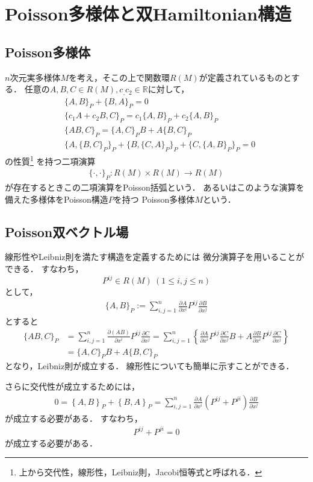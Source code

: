 \documentclass[dvipdfmx,12pt,a4paper,uplatex]{jsarticle}
\theoremstyle{plain}
\theoremstyle{definition}
\begin{document}
\section{Poisson多様体と双Hamiltonian構造}
\subsection{Poisson多様体}
$n次元$実多様体$M$を考え，そこの上で関数環$R(M)$が定義されているものとする．
任意の$A,B,C\in R(M),c_,c_2\in \mathbb{R}$に対して，
\begin{align}
&\{A,B \}_{P} + \{B,A\}_{P} = 0 \\
&\{c_1 A+c_2  B,C\}_{P} = c_1\{A,B\}_{P} + c_2\{A,B\}_{P} \\
&\{AB,C \}_{P} = \{A,C\}_{P}B + A\{B,C\}_{P} \\
&\{A,\{B,C\}_{P}\}_{P} + \{B,\{C,A\}_{P}\}_{P} + \{C,\{A,B\}_{P}\}_{P} = 0
\end{align}
の性質\footnote{上から交代性，線形性，Leibniz則，Jacobi恒等式と呼ばれる．}
を持つ二項演算
\begin{align}
    \{\cdot,\cdot\}_{P}:R(M) \times R(M) \longrightarrow R(M)
\end{align}
が存在するときこの二項演算をPoisson括弧という．
あるいはこのような演算を備えた多様体をPoisson構造$P$を持つ
Poisson多様体$M$という．

\subsection{Poisson双ベクトル場}
線形性やLeibniz則を満たす構造を定義するためには
微分演算子を用いることができる．
すなわち，
$$P^{ij}\in R(M) \ (1\le i,j \le n)$$
として，
\begin{align}
\{A,B\}_{P} := \sum_{i,j=1}^n 
\frac{\partial A}{\partial x^i} P^{ij}
\frac{\partial B}{\partial x^j}
\end{align}
とすると
\begin{align}
\{AB,C\}_{P} 
&= \sum_{i,j=1}^n 
\frac{\partial (AB)}{\partial x^i} P^{ij}
\frac{\partial C}{\partial x^j}
=
\sum_{i,j=1}^n
\left\{
\frac{\partial A}{\partial x^i} P^{ij}
\frac{\partial C}{\partial x^j} B
+
A
\frac{\partial B}{\partial x^i} P^{ij}
\frac{\partial C}{\partial x^j} 
\right\}\nonumber \\
&=
\{A,C\}_{P}B + A\{B,C\}_{P}
\end{align}
となり，Leibniz則が成立する．
線形性についても簡単に示すことができる．

さらに交代性が成立するためには，
\begin{align}
0=\left\{ A,B\right\}_{P} + \left\{ B,A\right\}_{P} 
=
\sum_{i,j=1}^n 
\frac{\partial A}{\partial x^i} \left(P^{ij}+P^{ji} \right)
\frac{\partial B}{\partial x^j}
\end{align}
が成立する必要がある．
すなわち，
\begin{align}
P^{ij}+P^{ji} = 0
\end{align}
が成立する必要がある．
\end{document}
